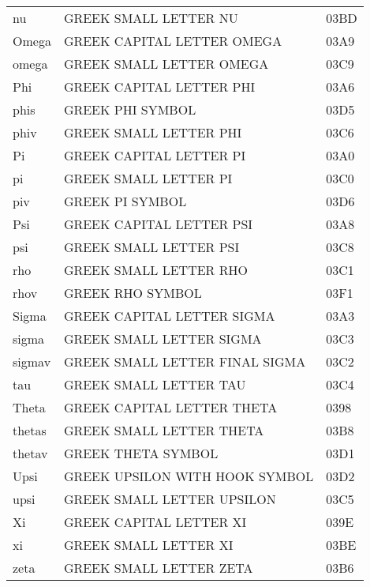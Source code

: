 \documentclass{book}
\begin{document}
\begin{longtable}{@{}lll}
nu                 & GREEK SMALL LETTER NU               & 03BD\\
Omega              & GREEK CAPITAL LETTER OMEGA          & 03A9\\
omega              & GREEK SMALL LETTER OMEGA            & 03C9\\
Phi                & GREEK CAPITAL LETTER PHI            & 03A6\\
phis               & GREEK PHI SYMBOL                    & 03D5\\
phiv               & GREEK SMALL LETTER PHI              & 03C6\\
Pi                 & GREEK CAPITAL LETTER PI             & 03A0\\
pi                 & GREEK SMALL LETTER PI               & 03C0\\
piv                & GREEK PI SYMBOL                     & 03D6\\
Psi                & GREEK CAPITAL LETTER PSI            & 03A8\\
psi                & GREEK SMALL LETTER PSI              & 03C8\\
rho                & GREEK SMALL LETTER RHO              & 03C1\\
rhov               & GREEK RHO SYMBOL                    & 03F1\\
Sigma              & GREEK CAPITAL LETTER SIGMA          & 03A3\\
sigma              & GREEK SMALL LETTER SIGMA            & 03C3\\
sigmav             & GREEK SMALL LETTER FINAL SIGMA      & 03C2\\
tau                & GREEK SMALL LETTER TAU              & 03C4\\
Theta              & GREEK CAPITAL LETTER THETA          & 0398\\
thetas             & GREEK SMALL LETTER THETA            & 03B8\\
thetav             & GREEK THETA SYMBOL                  & 03D1\\
Upsi               & GREEK UPSILON WITH HOOK SYMBOL      & 03D2\\
upsi               & GREEK SMALL LETTER UPSILON          & 03C5\\
Xi                 & GREEK CAPITAL LETTER XI             & 039E\\
xi                 & GREEK SMALL LETTER XI               & 03BE\\
zeta               & GREEK SMALL LETTER ZETA             & 03B6\\
\end{longtable}
\end{document}
